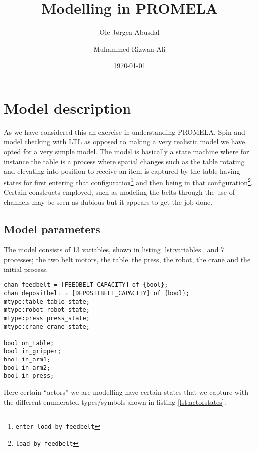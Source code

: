 \documentclass[12pt]{article}
\title{Modelling in PROMELA}
\author{
  Ole Jørgen Abusdal
  \and
  Muhammed Rizwan Ali
}
\date{\today}
\begin{document}
\maketitle
\section*{Model description}
As we have considered this an exercise in understanding PROMELA, Spin and model checking with LTL
as opposed to making a very realistic model we have opted for a very simple model. The model
is basically a state machine where for instance the table is a process where spatial changes
such as the table rotating and elevating into position to receive an item is captured by the
table having states for first entering that
configuration\footnote{\texttt{enter\_load\_by\_feedbelt}} and then being in that
configuration\footnote{\texttt{load\_by\_feedbelt}}. Certain constructs employed,
such as modeling the belts through the use of channels may be seen as dubious but it
appears to get the job done.

\subsection*{Model parameters}
The model consists of 13 variables, shown in listing \ref{lst:variables}, and
7 processes; the two belt motors, the table, the press,
the robot, the crane and the initial process.


\begin{lstlisting}[caption={variables used},label={lst:variables}]
chan feedbelt = [FEEDBELT_CAPACITY] of {bool};
chan depositbelt = [DEPOSITBELT_CAPACITY] of {bool};
mtype:table table_state;
mtype:robot robot_state;
mtype:press press_state;
mtype:crane crane_state;

bool on_table;
bool in_gripper;
bool in_arm1;
bool in_arm2;
bool in_press;
\end{lstlisting}

Here certain ``actors'' we are modelling have certain states that we
capture with the different enumerated types/symbols shown in listing
\ref{lst:actorstates}.
\end{document}
